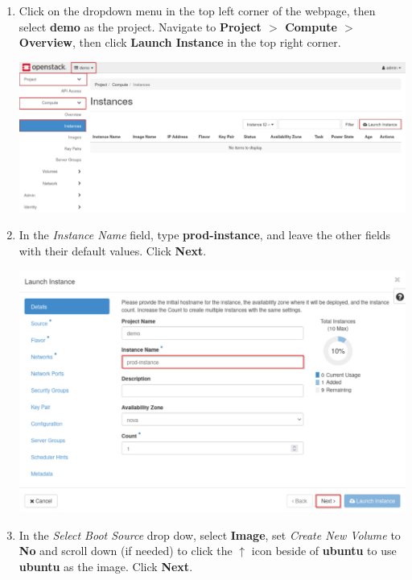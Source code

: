 \documentclass[letterpaper, 12pt]{article}
\begin{document}
\begin{enumerate}
    \item Click on the dropdown menu in the top left corner of the webpage, then select \textbf{demo} as the project.
    Navigate to \textbf{Project $>$ Compute $>$ Overview}, then click \textbf{Launch Instance} in the top right corner.

    \begin{center}
        \includegraphics[width=\linewidth]{images/part1/step4.png}
    \end{center}

    \item In the \textit{Instance Name} field, type \textbf{prod-instance}, and leave the other fields with their
    default values. Click \textbf{Next}.

    \begin{center}
        \includegraphics[width=\linewidth]{images/part1/step5.png}
    \end{center}

    \item In the \textit{Select Boot Source} drop dow, select \textbf{Image}, set \textit{Create New Volume} to
    \textbf{No} and scroll down (if needed) to click the $\uparrow$ icon beside of \textbf{ubuntu} to use
    \textbf{ubuntu} as the image. Click \textbf{Next}.


\end{enumerate}
\end{document}
